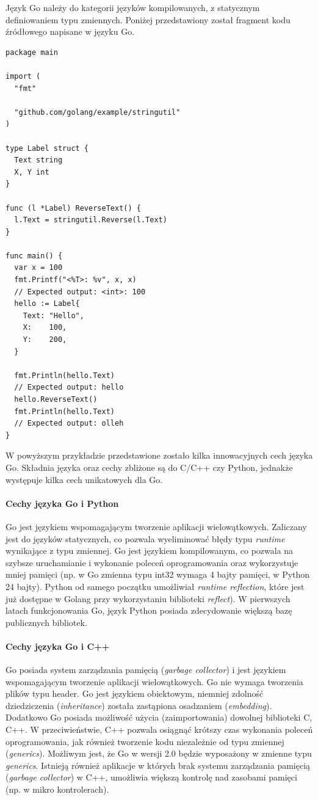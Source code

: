 \documentclass[a4paper,12pt,twoside,openany]{report}
\begin{document}
Język Go należy do kategorii języków kompilowanych, z statycznym definiowaniem typu zmiennych. 
Poniżej przedstawiony został fragment kodu źródłowego napisane w języku Go.

\begin{lstlisting}
package main

import (
  "fmt"

  "github.com/golang/example/stringutil"
)

type Label struct {
  Text string
  X, Y int
}

func (l *Label) ReverseText() {
  l.Text = stringutil.Reverse(l.Text)
}

func main() {
  var x = 100
  fmt.Printf("<%T>: %v", x, x)
  // Expected output: <int>: 100
  hello := Label{
    Text: "Hello",
    X:    100,
    Y:    200,
  }
  
  fmt.Println(hello.Text)
  // Expected output: hello
  hello.ReverseText()
  fmt.Println(hello.Text)
  // Expected output: olleh
}

\end{lstlisting}

W powyższym przykładzie przedstawione zostało kilka innowacyjnych cech języka Go.
Składnia języka oraz cechy zbliżone są do C/C++ czy Python, jednakże występuje kilka cech unikatowych dla Go.

\paragraph{Cechy języka Go i Python}
Go jest językiem wspomagającym tworzenie aplikacji wielowątkowych. Zaliczany jest do języków statycznych, co pozwala wyeliminować błędy typu \textit{runtime} wynikające z typu zmiennej.
Go jest językiem kompilowanym, co pozwala na szybsze uruchamianie i wykonanie poleceń oprogramowania oraz wykorzystuje mniej pamięci (np. w Go zmienna typu int32 wymaga 4 bajty pamięci, w Python 24 bajty).
Python od samego początku umożliwiał \textit{runtime reflection}, które jest już dostępne w Golang przy wykorzystaniu biblioteki \textit{reflect}). 
W pierwszych latach funkcjonowania Go, język Python posiada zdecydowanie większą bazę publicznych bibliotek.

\paragraph{Cechy języka Go i C++}
Go posiada system zarządzania pamięcią (\textit{garbage collector}) i jest językiem wspomagającym tworzenie aplikacji wielowątkowych.
Go nie wymaga tworzenia plików typu header.
Go jest językiem obiektowym, niemniej zdolność dziedziczenia (\textit{inheritance}) została zastąpiona osadzaniem (\textit{embedding}).
Dodatkowo Go posiada możliwość użycia (zaimportowania) dowolnej biblioteki C, C++.
W przeciwieństwie, C++ pozwala osiągnąć krótszy czas wykonania poleceń oprogramowania, jak również tworzenie kodu niezależnie od typu zmiennej (\textit{generics}).
Możliwym jest, że Go w wersji 2.0 będzie wyposażony w zmienne typu \textit{generics}.
Istnieją również aplikacje w których brak systemu zarządzania pamięcią (\textit{garbage collector}) w C++, umożliwia większą kontrolę nad zasobami pamięci (np. w mikro kontrolerach).
\end{document}
